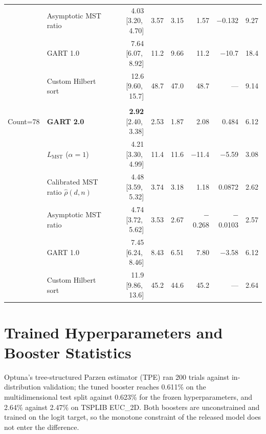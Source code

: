\documentclass{article}
\begin{document}
\begin{longtable}{@{}>{\footnotesize}l >{\footnotesize}l >{\footnotesize}r>{\footnotesize}r>{\footnotesize}r>{\footnotesize}r>{\footnotesize}r>{\footnotesize}r@{}}
  & Asymptotic MST ratio & 4.03 \scriptsize[3.20,\,4.70] & 3.57 & 3.15 & 1.57 & $-$0.132 & 9.27 \\*
  & GART 1.0 & 7.64 \scriptsize[6.07,\,8.92] & 11.2 & 9.66 & 11.2 & $-$10.7 & 18.4 \\*
  & Custom Hilbert sort & 12.6 \scriptsize[9.60,\,15.7] & 48.7 & 47.0 & 48.7 & --- & 9.14 \\
\midrule
\multirow{6}{*}{\makecell[l]{\textbf{Total}\\ Count=78}}
  & \textbf{GART 2.0} & \textbf{2.92} \scriptsize[2.40,\,3.38] & 2.53 & 1.87 & 2.08 & 0.484 & 6.12 \\*
  & $L_{\mathrm{MST}}$ ($\alpha=1$) & 4.21 \scriptsize[3.30,\,4.99] & 11.4 & 11.6 & $-$11.4 & $-$5.59 & 3.08 \\*
  & Calibrated MST ratio $\hat\rho(d,n)$ & 4.48 \scriptsize[3.59,\,5.32] & 3.74 & 3.18 & 1.18 & 0.0872 & 2.62 \\*
  & Asymptotic MST ratio & 4.74 \scriptsize[3.72,\,5.62] & 3.53 & 2.67 & $-$0.268 & $-$0.0103 & 2.57 \\*
  & GART 1.0 & 7.45 \scriptsize[6.24,\,8.46] & 8.43 & 6.51 & 7.80 & $-$3.58 & 6.12 \\*
  & Custom Hilbert sort & 11.9 \scriptsize[9.86,\,13.6] & 45.2 & 44.6 & 45.2 & --- & 2.64 \\
\bottomrule
\end{longtable}
\endgroup



\section{Trained Hyperparameters and Booster Statistics} \label{app:hyperparams}

Optuna's tree-structured Parzen estimator (TPE) ran 200 trials against in-distribution validation; the tuned booster reaches 0.611\% on the multidimensional test split against 0.623\% for the frozen hyperparameters, and 2.64\% against 2.47\% on TSPLIB EUC\_2D. Both boosters are unconstrained and trained on the logit target, so the monotone constraint of the released model does not enter the difference.
\end{document}
